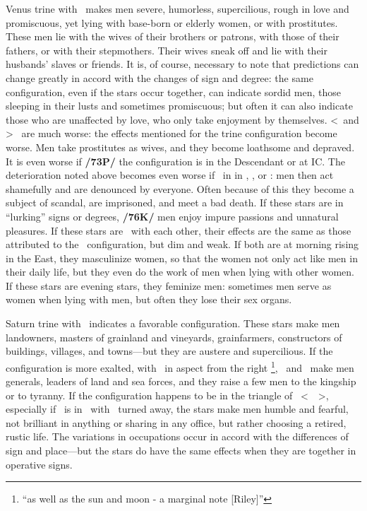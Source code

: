 Venus \marginnote{\Venus \Trine \Saturn} trine with \Saturn\, makes men severe, humorless, supercilious, rough in love and promiscuous, yet lying with base-born or elderly women, or with prostitutes. These men lie with the wives of their brothers or patrons, with those of their fathers, or with their stepmothers. Their wives sneak off and lie with their husbands’ slaves or friends. \mndl It is, of course, necessary to note that predictions can change greatly
in accord with the changes of sign and degree: the same configuration, even if the stars occur together, can
indicate sordid men, those sleeping in their lusts and sometimes promiscuous; but often it can also indicate
those who are unaffected by love, who only take enjoyment by themselves. <\Venus\, and \Saturn> \Square\, are much worse: the effects mentioned for the trine configuration become worse. Men take prostitutes as wives, and they become loathsome and depraved. It is even worse if \textbf{/73P/} the configuration is in the Descendant or at IC. The deterioration noted above becomes even worse if \Mars\, in in \Conjunction, \Square, or \Opposition: men then act shamefully and are denounced by everyone. Often because of this they become a subject of scandal, are imprisoned, and meet a bad death. If these stars are in “lurking” signs or degrees,
\textbf{/76K/} men enjoy impure passions and unnatural pleasures. If these stars are \Sextile\, with each other, their effects are the same as those attributed to the \Trine\, configuration, but dim and weak. If both are at morning rising in the East, they masculinize women, so that the women not only act like men in their daily life, but
they even do the work of men when lying with other women. If these stars are evening stars, they feminize men: sometimes men serve as women when lying with men, but often they lose their sex organs.

Saturn \marginnote{\Saturn \Trine \Jupiter} trine with \Jupiter\, indicates a favorable configuration. These stars make men landowners, masters of grainland and vineyards, grainfarmers, constructors of buildings, villages, and towns—but they are austere and supercilious. If the configuration is more exalted, with \Mars\, in aspect from the right
\footnote{``as well as the sun and moon - a marginal note [Riley]''},
\Saturn\, and \Jupiter\, make men generals, leaders of land and sea forces, and they raise a few men to the
kingship or to tyranny. If the configuration happens to be in the triangle of \Saturn\, <\Gemini\, \Libra\, \Aquarius>, especially if \Jupiter\, is in \Aquarius\, with \Mars\, turned away, the stars make men humble and fearful, not brilliant in anything or sharing in any office, but rather choosing a retired, rustic life. \mndl The variations in occupations occur in accord with the differences of sign and place—but the stars do have the same effects when they are together in operative signs.

